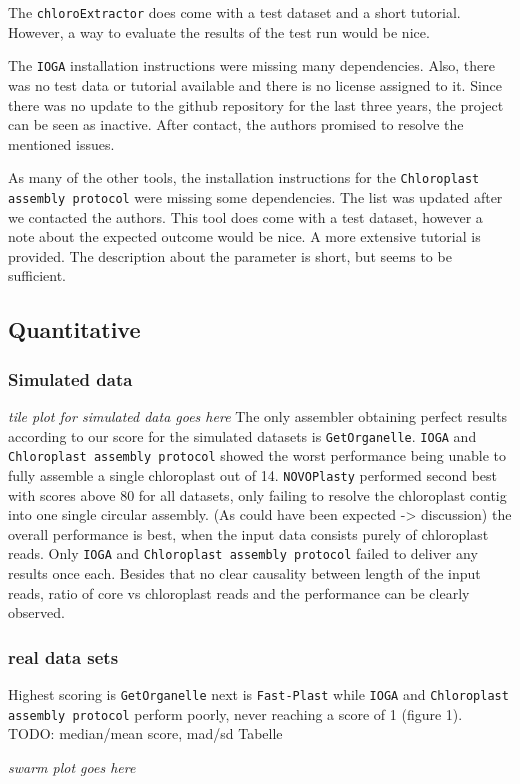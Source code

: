 \documentclass{bmcart}
\newcommand{\formatprogramnames}[1]{\texttt{#1}}
\newcommand{\ce}{\formatprogramnames{chloroExtractor}}
\newcommand{\fp}{\formatprogramnames{Fast-Plast}}
\newcommand{\ioga}{\formatprogramnames{IOGA}}
\newcommand{\np}{\formatprogramnames{NOVOPlasty}}
\newcommand{\go}{\formatprogramnames{GetOrganelle}}
\newcommand{\cassp}{\formatprogramnames{Chloroplast assembly protocol}}
\begin{document}
The \ce{} does come with a test dataset and a short tutorial. However, a way to evaluate the results of the test run would be nice.

The \ioga{} installation instructions were missing many dependencies. Also, there was no test data or tutorial available and there is no license assigned to it. Since there was no update to the github repository for the last three years, the project can be seen as inactive. After contact, the authors promised to resolve the mentioned issues.

As many of the other tools, the installation instructions for the \cassp{} were missing some dependencies. The list was updated after we contacted the authors. This tool does come with a test dataset, however a note about the expected outcome would be nice. A more extensive tutorial is provided. The description about the parameter is short, but seems to be sufficient.

\subsection*{Quantitative}
\subsubsection*{Simulated data}
\textit{tile plot for simulated data goes here}
The only assembler obtaining perfect results according to our score for the simulated datasets is \go{}.
\ioga{} and \cassp{} showed the worst performance being unable to fully assemble a single chloroplast out of 14.
\np{} performed second best with scores above 80 for all datasets, only failing to resolve the chloroplast contig into one single circular assembly.
(As could have been expected -> discussion) the overall performance is best, when the input data consists purely of chloroplast reads.
Only \ioga{} and \cassp{} failed to deliver any results once each.
Besides that no clear causality between length of the input reads, ratio of core vs chloroplast reads and the performance can be clearly observed. 

\subsubsection*{real data sets}
Highest scoring is \go{} next is \fp{} while \ioga{} and \cassp{} perform poorly, never reaching a score of 1 (figure 1). TODO: median/mean score, mad/sd Tabelle

\textit{swarm plot goes here}
\end{document}
